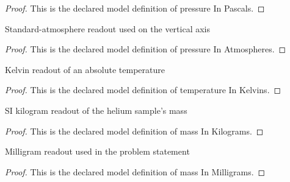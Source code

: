 \begin{proof}
  This is the declared model definition of pressure In Pascals.
\end{proof}
\begin{definition}
  \label{def:physics:phyx-mini-0415:phyxminiproblems-problemphyxmini0415-pressureinatmospheres}
  Standard-atmosphere readout used on the vertical axis
\end{definition}
\begin{proof}
  This is the declared model definition of pressure In Atmospheres.
\end{proof}
\begin{definition}
  \label{def:physics:phyx-mini-0415:phyxminiproblems-problemphyxmini0415-temperatureinkelvins}
  Kelvin readout of an absolute temperature
\end{definition}
\begin{proof}
  This is the declared model definition of temperature In Kelvins.
\end{proof}
\begin{definition}
  \label{def:physics:phyx-mini-0415:phyxminiproblems-problemphyxmini0415-massinkilograms}
  SI kilogram readout of the helium sample's mass
\end{definition}
\begin{proof}
  This is the declared model definition of mass In Kilograms.
\end{proof}
\begin{definition}
  \label{def:physics:phyx-mini-0415:phyxminiproblems-problemphyxmini0415-massinmilligrams}
  Milligram readout used in the problem statement
\end{definition}
\begin{proof}
  This is the declared model definition of mass In Milligrams.
\end{proof}
